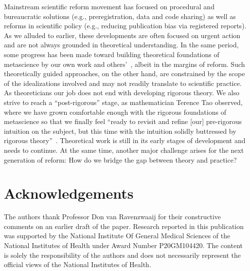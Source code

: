\documentclass[meta,authordate]{jote-new-article}
\newcounter{result}
\begin{document}
Mainstream scientific reform movement has focused on procedural and bureaucratic solutions (e.g., preregistration, data and code sharing) as well as reforms in scientific policy (e.g., reducing publication bias via registered reports). As we alluded to earlier, these developments are often focused on urgent action and are not always grounded in theoretical understanding. In the same period, some progress has been made toward building theoretical foundations of metascience by our own work and others'~\parencite{bak2022replication,fanelli2022metric,fanelli2022tau,smaldino2016natural}, albeit in the margins of reform. Such theoretically guided approaches, on the other hand, are constrained by the scope of the idealizations involved and may not readily translate to scientific practice. As theoreticians our job does not end with developing rigorous theory. We also strive to reach a ``post-rigorous'' stage, as mathematician Terence Tao observed, where we have grown comfortable enough with the rigorous foundations of metascience so that we finally feel ``ready to revisit and refine [our] pre-rigorous intuition on the subject, but this time with the intuition solidly buttressed by rigorous theory''~\parencite{tao_2007}. Theoretical work is still in its early stages of development and needs to continue. At the same time, another major challenge arises for the next generation of reform: How do we bridge the gap between theory and practice?

\section{Acknowledgements}
The authors thank Professor Don van Ravenzwaaij for their constructive comments on an earlier draft of the paper. Research reported in this publication was supported by the National Institute Of General Medical Sciences of the National Institutes of Health under Award Number P20GM104420. The content is solely the responsibility of the authors and does not necessarily represent the official views of the National Institutes of Health.


\end{document}
